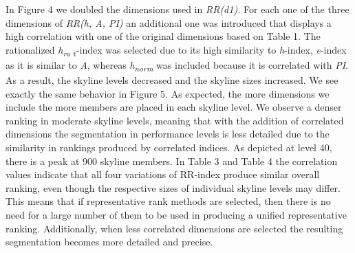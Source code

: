 In Figure 4 we doubled the dimensions used in \emph{RR(d1).} For each
one of the three dimensions of \emph{RR(h, A, PI)} an additional one was
introduced that displays a high correlation with one of the original
dimensions based on Table 1. The rationalized
\emph{h\textsubscript{ra}} \textsubscript{t}-index was selected due to
its high similarity to \emph{h}-index, \emph{e}-index as it is similar
to \emph{A}, whereas \emph{h\textsubscript{norm}} was included because
it is correlated with \emph{PI}. As a result, the skyline levels
decreased and the skyline sizes increased. We see exactly the same
behavior in Figure 5. As expected, the more dimensions we include the
more members are placed in each skyline level. We observe a denser
ranking in moderate skyline levels, meaning that with the addition of
correlated dimensions the segmentation in performance levels is less
detailed due to the similarity in rankings produced by correlated
indices. As depicted at level 40, there is a peak at 900 skyline
members. In Table 3 and Table 4 the correlation values indicate that all
four variations of RR-index produce similar overall ranking, even though
the respective sizes of individual skyline levels may differ. This means
that if representative rank methods are selected, then there is no need
for a large number of them to be used in producing a unified
representative ranking. Additionally, when less correlated dimensions
are selected the resulting segmentation becomes more detailed and
precise.